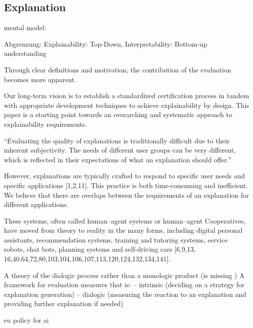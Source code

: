 \label{02_basics:explainable_system}

\label{02_basics:explainability}

\label{02_basics:quality_quaracteristic}

\subsection{Explanation}

\cite{chazette_knowledge_nodate}

\cite{kohl_explainability_2019}

mental model: \cite{chi_three_nodate}

Abgrenzung: Explainability: Top-Down, Interpretability: Bottom-up understanding \cite{thomson_knowledge--information_2020}

\glqq Through clear definitions and motivation, the contribution of the evaluation becomes more apparent. \grqq{} \cite{waa_evaluating_2021}

Our long-term vision is to establish a standardized certification process in tandem with appropriate development techniques to achieve explainability by design. This paper is a starting point towards an overarching and systematic approach to explainability requirements.

“Evaluating the quality of explanations is traditionally difficult due to their inherent subjectivity. The needs of different user groups can be very different, which is reflected in their expectations of what an explanation should offer.” \cite{martin_developing_2019, martin_evaluating_2021}

However, explanations are typically crafted to respond to specific user needs and specific applications [1,2,11]. This practice is both time-consuming and inefficient. We believe that there are overlaps between the requirements of an explanation for different applications. \cite{martin_developing_2019}

These systems, often called human–agent systems or human–agent Cooperatives, have moved from theory to reality in the many forms, including digital personal assistants, recommendation systems, training and tutoring systems, service robots, chat bots, planning systems and self-driving cars [6,9,13, 16,40,64,72,80,103,104,106,107,113,120,124,132,134,141].

A theory of the dialogic process rather than a monologic product (is missing \cite{cassens_ambient_2019}) A framework for evaluation measures that is: – intrinsic (deciding on a strategy for explanation generation) – dialogic (measuring the reaction to an explanation and providing further explanation if needed)

\cite{hleg2019policy} eu policy for ai
